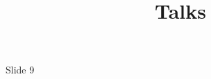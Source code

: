 \documentclass[a4paper,10pt]{article}
\title{Talks}
\begin{document}
\maketitle
\section{}
Slide 9
% 
% 
\end{document}
